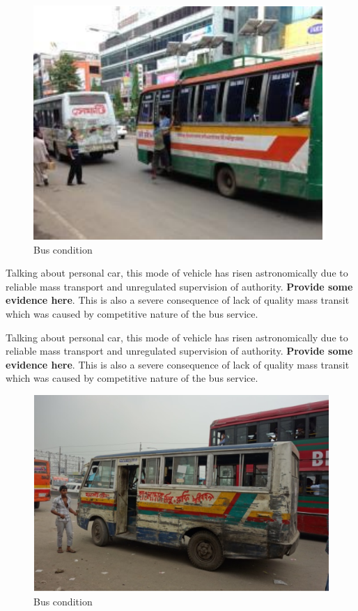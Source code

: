 \documentclass[
  11pt,
]{article}
\begin{document}
\begin{figure}  
 \begin{center}
    \includegraphics{./figures/rtsp_bus_condition1.png}  
  \caption{Bus condition} 
\end{center}
\end{figure}

Talking about personal car, this mode of vehicle has risen
astronomically due to reliable mass transport and unregulated
supervision of authority. \textbf{Provide some evidence here}. This is
also a severe consequence of lack of quality mass transit which was
caused by competitive nature of the bus service.

Talking about personal car, this mode of vehicle has risen
astronomically due to reliable mass transport and unregulated
supervision of authority. \textbf{Provide some evidence here}. This is
also a severe consequence of lack of quality mass transit which was
caused by competitive nature of the bus service.

\begin{figure}  
 \begin{center}
    \includegraphics{./figures/rtsp_bus_condition2.png}  
  \caption{Bus condition} 
\end{center}
\end{figure}
\end{document}
